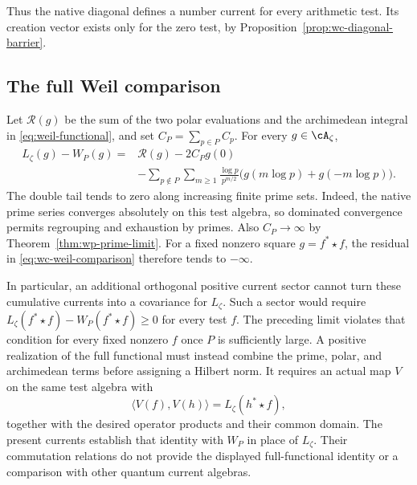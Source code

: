 Thus the native diagonal defines a number current for every arithmetic
test.  Its creation vector exists only for the zero test, by
Proposition~\ref{prop:wc-diagonal-barrier}.

\subsection{The full Weil comparison}

Let $\mathcal R(g)$ be the sum of the two polar evaluations and the
archimedean integral in \eqref{eq:weil-functional}, and set
$C_P=\sum_{p\in P}C_p$.  For every $g\in\cA_\zeta$,
\begin{equation}
 \begin{split}
 L_\zeta(g)-W_P(g)
 ={}&\mathcal R(g)-2C_Pg(0)\\
 &-\sum_{p\notin P}\sum_{m\geq1}
 \frac{\log p}{p^{m/2}}
 \bigl(g(m\log p)+g(-m\log p)\bigr).
 \end{split}
 \label{eq:wc-weil-comparison}
\end{equation}
The double tail tends to zero along increasing finite prime sets.
Indeed, the native prime series converges absolutely on this test algebra,
so dominated convergence permits regrouping and exhaustion by primes.
Also $C_P\to\infty$ by Theorem~\ref{thm:wp-prime-limit}.
For a fixed nonzero square $g=f^*\star f$, the residual in
\eqref{eq:wc-weil-comparison} therefore tends to $-\infty$.

In particular, an additional orthogonal positive current sector cannot
turn these cumulative currents into a covariance for $L_\zeta$.
Such a sector would require
$L_\zeta(f^*\star f)-W_P(f^*\star f)\geq0$ for every test $f$.
The preceding limit violates that condition for every fixed nonzero
$f$ once $P$ is sufficiently large.
A positive realization of the full functional must instead combine
the prime, polar, and archimedean terms before assigning a Hilbert norm.
It requires an actual map $V$ on the same test algebra with
\[
 \langle V(f),V(h)\rangle=L_\zeta(h^*\star f),
\]
together with the desired operator products and their common domain.
The present currents establish that identity with $W_P$ in place of
$L_\zeta$.  Their commutation relations do not provide the displayed
full-functional identity or a comparison with other quantum current algebras.
